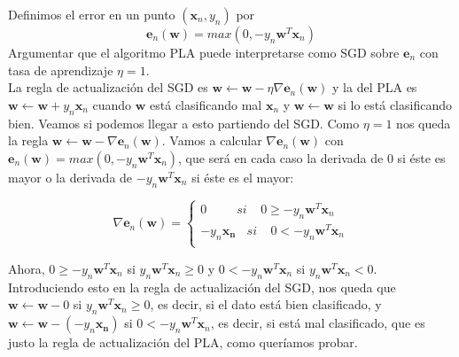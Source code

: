 \documentclass[12pt]{article}
\theoremstyle{definition}
\begin{document}
\begin{pregunta}
Definimos el error en un punto $(\mathbf{x}_n,y_n)$ por 
\[		\mathbf{e}_n(\mathbf{w})=max(0,-y_n\mathbf{w}^T\mathbf{x}_n)		\]
Argumentar que el algoritmo PLA puede interpretarse como SGD sobre $\mathbf{e}_n$ con tasa de aprendizaje $\eta=1$.\\

La regla de actualización del SGD es $\mathbf{w} \leftarrow \mathbf{w} - \eta\nabla \mathbf{e}_n(\mathbf{w})$ y la del PLA es $\mathbf{w} \leftarrow \mathbf{w} + y_n\mathbf{x}_n$ cuando $\mathbf{w}$ está clasificando mal $\mathbf{x}_n$ y $\mathbf{w} \leftarrow \mathbf{w}$ si lo está clasificando bien. Veamos si podemos llegar a esto partiendo del SGD. Como $\eta = 1$ nos queda la regla $\mathbf{w} \leftarrow \mathbf{w} - \nabla \mathbf{e}_n(\mathbf{w})$. Vamos a calcular $\nabla \mathbf{e}_n(\mathbf{w})$ con $\mathbf{e}_n(\mathbf{w})=max(0,-y_n\mathbf{w}^T\mathbf{x}_n)$, que será en cada caso la derivada de 0 si éste es mayor o la derivada de $-y_n\mathbf{w}^T\mathbf{x}_n$ si éste es el mayor:

\begin{equation}
\nabla \mathbf{e}_n(\mathbf{w}) = 
  \left\lbrace
  \begin{array}{l}
     0\ \ \ \ \ \ \ \ \ \ \ si\ \ \ \ \  0 \geq -y_n\mathbf{w}^T\mathbf{x}_n \\
     -y_n\mathbf{x_n}\ \ \ \  si\ \ \ \ \  0 < -y_n\mathbf{w}^T\mathbf{x}_n \\
  \end{array}
  \right.
\end{equation}

Ahora, $0 \geq -y_n\mathbf{w}^T\mathbf{x}_n$ si $y_n\mathbf{w}^T\mathbf{x}_n \geq 0$ y $0 < -y_n\mathbf{w}^T\mathbf{x}_n$ si $y_n\mathbf{w}^T\mathbf{x}_n < 0$. Introduciendo esto en la regla de actualización del SGD, nos queda que $\mathbf{w} \leftarrow \mathbf{w} - 0$ si $y_n\mathbf{w}^T\mathbf{x}_n \geq 0$, es decir, si el dato está bien clasificado, y $\mathbf{w} \leftarrow \mathbf{w} - (-y_n\mathbf{x_n})$ si $0 < -y_n\mathbf{w}^T\mathbf{x}_n$, es decir, si está mal clasificado, que es justo la regla de actualización del PLA, como queríamos probar.

\end{pregunta}
\end{document}

